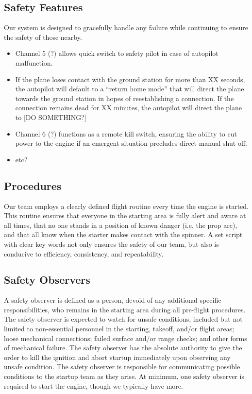 \documentclass[10pt]{report}
\begin{document}
\subsection{Safety Features}
Our system is designed to gracefully handle any failure while continuing to ensure the safety of those nearby. 
\begin{itemize}
	\setlength{\itemsep}{0cm}
	\setlength{\parskip}{0cm}
	\item Channel 5 (?) allows quick switch to safety pilot in case of autopilot malfunction.
	\item If the plane loses contact with the ground station for more than XX seconds, the autopilot will default to a ``return home mode'' that will direct the plane towards the ground station in hopes of reestablishing a connection.  If the connection remains dead for XX minutes, the autopilot will direct the plane to [DO SOMETHING?]
	\item Channel 6 (?) functions as a remote kill switch, ensuring the ability to cut power to the engine if an emergent situation precludes direct manual shut off.
	\item etc?
\end{itemize}

\subsection{Procedures}
Our team employs a clearly defined flight routine every time the engine is started.  This routine ensures that everyone in the starting area is fully alert and aware at all times, that no one stands in a position of known danger (i.e. the prop arc), and that all know when the starter makes contact with the spinner.  A set script with clear key words not only ensures the safety of our team, but also is conducive to efficiency, consistency, and repeatability.

\subsection{Safety Observers}
A safety observer is defined as a person, devoid of any additional specific responsibilities, who remains in the starting area during all pre-flight procedures.  The safety observer is expected to watch for unsafe conditions, included but not limited to non-essential personnel in the starting, takeoff, and/or flight areas; loose mechanical connections; failed surface and/or range checks; and other forms of mechanical failure.  The safety observer has the absolute authority to give the order to kill the ignition and abort startup immediately upon observing any unsafe condition.  The safety observer is responsible for communicating possible conditions to the startup team as they arise. At minimum, one safety observer is required to start the engine, though we typically have more.
\end{document}

